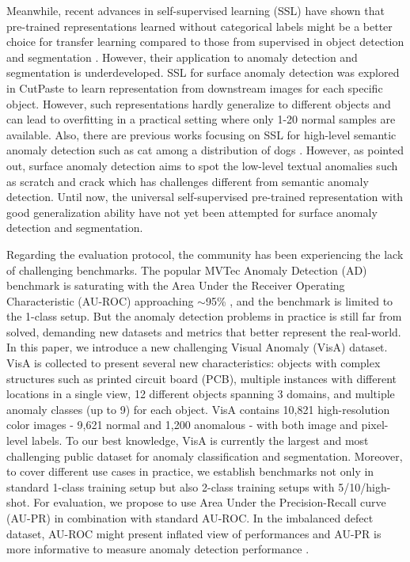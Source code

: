 Meanwhile, recent advances in self-supervised learning (SSL) have shown that pre-trained representations learned without categorical labels might be a better choice for transfer learning compared to those from supervised in object detection and segmentation \cite{chen2020simple,chen2021exploring,he2020momentum}. However, their application to anomaly detection and segmentation is underdeveloped. SSL for surface anomaly detection was explored in CutPaste \cite{li2021cutpaste} to learn representation from downstream images for each specific object. However, such representations hardly generalize to different objects and can lead to overfitting in a practical setting where only 1-20 normal samples are available. Also, there are previous works focusing on SSL for high-level semantic anomaly detection such as cat among a distribution of dogs \cite{cook2020consult,davis2006relationship,saito2015precision}. However, as \cite{ruff2021unifying} pointed out, surface anomaly detection aims to spot the low-level textual anomalies such as scratch and crack which has challenges different from semantic anomaly detection. Until now, the universal self-supervised pre-trained representation with good generalization ability have not yet been attempted for surface anomaly detection and segmentation.

Regarding the evaluation protocol, the community has been experiencing the lack of challenging benchmarks. The popular MVTec Anomaly Detection (AD) benchmark \cite{bergmann2021mvtec} is  saturating with the Area Under the Receiver Operating Characteristic (AU-ROC) approaching $\sim$95\% \cite{defard2021padim,li2021cutpaste}, and the benchmark is limited to the 1-class setup. But the anomaly detection problems in practice is still far from solved, demanding new datasets and metrics that better represent the real-world. In this paper, we introduce a new challenging Visual Anomaly (VisA) dataset. VisA is collected to present several new characteristics: objects with complex structures such as printed circuit board (PCB), multiple instances with different locations in a single view, 12 different objects spanning 3 domains, and multiple anomaly classes (up to 9) for each object. VisA contains 10,821 high-resolution color images - 9,621 normal and 1,200 anomalous - with both image and pixel-level labels. To our best knowledge, VisA is currently the largest and most challenging public dataset for anomaly classification and segmentation. Moreover, to cover different use cases in practice, we establish benchmarks not only in standard 1-class training setup but also 2-class training setups with 5/10/high-shot. For evaluation, we propose to use Area Under the Precision-Recall curve (AU-PR) in combination with standard AU-ROC. In the imbalanced defect dataset, AU-ROC might present inflated view of performances and AU-PR is more informative to measure anomaly detection performance \cite{cook2020consult,davis2006relationship,saito2015precision}.

